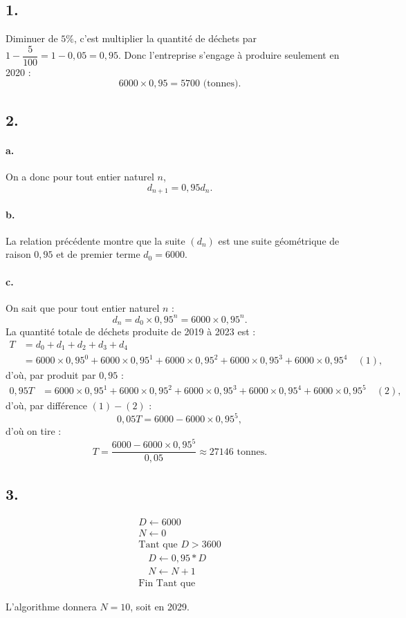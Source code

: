 \subsection*{1.}
	Diminuer de \(5\%\), c'est multiplier la quantité de déchets par \(1 - \dfrac{5}{100} = 1 - 0,05 = 0,95\). Donc l'entreprise s'engage à produire seulement en 2020 :
	\[
	6000 \times 0,95 = 5700 \text{ (tonnes)}.
	\]
	
	\subsection*{2.}
	
	\paragraph{a.} On a donc pour tout entier naturel \(n\),
	\[
	d_{n+1} = 0,95 d_n.
	\]
	
	\paragraph{b.} La relation précédente montre que la suite \((d_n)\) est une suite géométrique de raison \(0,95\) et de premier terme \(d_0 = 6000\).
	
	\paragraph{c.} On sait que pour tout entier naturel \(n\) :
	\[
	d_n = d_0 \times 0,95^n = 6000 \times 0,95^n.
	\]
	La quantité totale de déchets produite de 2019 à 2023 est :
	\begin{align*}
		T &= d_0 + d_1 + d_2 + d_3 + d_4 \\
		&= 6000 \times 0,95^0 + 6000 \times 0,95^1 + 6000 \times 0,95^2 + 6000 \times 0,95^3 + 6000 \times 0,95^4 \quad (1),
	\end{align*}
	d'où, par produit par \(0,95\) :
	\begin{align*}
		0,95T &= 6000 \times 0,95^1 + 6000 \times 0,95^2 + 6000 \times 0,95^3 + 6000 \times 0,95^4 + 6000 \times 0,95^5 \quad (2),
	\end{align*}
	d'où, par différence \((1) - (2)\) :
	\[
	0,05T = 6000 - 6000 \times 0,95^5,
	\]
	d'où on tire :
	\[
	T = \dfrac{6000 - 6000 \times 0,95^5}{0,05} \approx 27146 \text{ tonnes}.
	\]
	
	\subsection*{3.}
	\begin{tcolorbox}[colback=white,colframe=black,left=1mm,right=1mm,top=1mm,bottom=1mm,boxsep=0mm]
		\[
		\begin{array}{l}
			D \leftarrow 6000 \\
			N \leftarrow 0 \\
			\text{Tant que } D > 3600 \\
			\quad D \leftarrow 0,95 * D \\
			\quad N \leftarrow N + 1 \\
			\text{Fin Tant que}
		\end{array}
		\]
	\end{tcolorbox}
	
	L'algorithme donnera \(N = 10\), soit en 2029.

